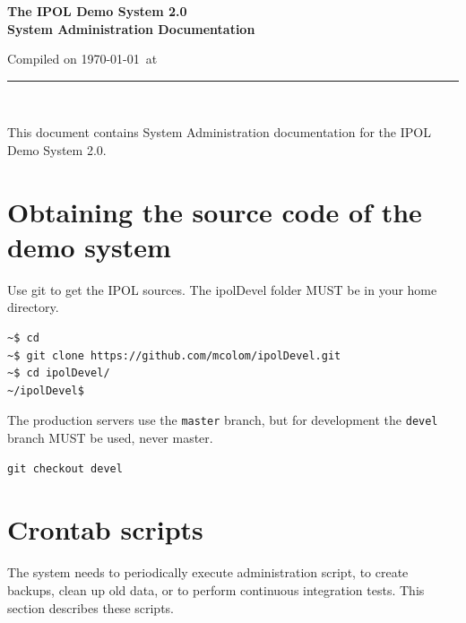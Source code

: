 \documentclass[a4paper,12pt]{article}
\begin{document}
\begin{titlepage}

\begin{center}
\vspace*{-1in}

\vspace*{0.6in}
\begin{Large}
\textbf{The IPOL Demo System 2.0 \\System Administration Documentation} \\
\end{Large}

\vspace*{0.6in}

\small{Compiled on \today\ at \currenttime}

\vspace*{0.6in}
\rule{80mm}{0.1mm}\\
\vspace*{0.1in}
\end{center}

\end{titlepage}

This document contains System Administration documentation for the IPOL Demo System 2.0.
\vspace*{0.6in}


\newpage

\tableofcontents
\newpage

\section{Obtaining the source code of the demo system}
Use git to get the IPOL sources. The ipolDevel folder MUST be in your home directory.
\begin{verbatim}
~$ cd
~$ git clone https://github.com/mcolom/ipolDevel.git
~$ cd ipolDevel/
~/ipolDevel$
\end{verbatim}

The production servers use the {\tt master} branch, but for development the {\tt devel} branch MUST be used, never master.
\begin{verbatim}
git checkout devel
\end{verbatim}


\section{Crontab scripts}
The system needs to periodically execute administration script, to create backups, clean up old data, or to perform continuous integration tests. This section describes these scripts.
\end{document}
